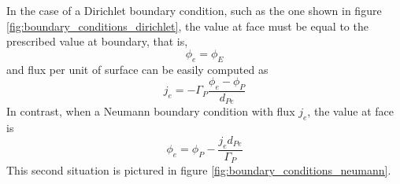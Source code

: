 \noindent
In the case of a Dirichlet boundary condition, such as the one shown in figure \ref{fig:boundary_conditions_dirichlet}, the value at face must be equal to the prescribed value at boundary, that is,
\begin{equation}
	\phi_e = \phi_E
\end{equation}
and flux per unit of surface can be easily computed as
\begin{equation}
	j_e = -\Gamma_P \frac{\phi_e - \phi_P}{d_{Pe}}
\end{equation}
In contrast, when a Neumann boundary condition with flux $j_e$, the value at face is
\begin{equation}
	\phi_e = \phi_P - \frac{j_e d_{Pe}}{\Gamma_P}
\end{equation}
This second situation is pictured in figure \ref{fig:boundary_conditions_neumann}.